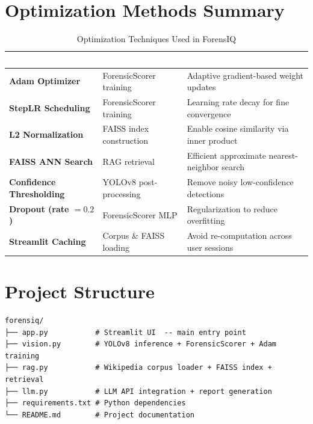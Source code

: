 \documentclass[12pt,a4paper]{article}
\begin{document}
\section{Optimization Methods Summary}

\begin{table}[h!]
  \centering
  \caption{Optimization Techniques Used in ForensIQ}
  \begin{tabular}{>{\bfseries}p{4.5cm} p{4cm} p{5cm}}
    \toprule
    \rowcolor{tableheader}
    \textcolor{white}{Method} & \textcolor{white}{Location} & \textcolor{white}{Purpose} \\
    \midrule
    Adam Optimizer          & ForensicScorer training  & Adaptive gradient-based weight updates \\
    \addlinespace
    StepLR Scheduling       & ForensicScorer training  & Learning rate decay for fine convergence \\
    \addlinespace
    L2 Normalization        & FAISS index construction & Enable cosine similarity via inner product \\
    \addlinespace
    FAISS ANN Search        & RAG retrieval            & Efficient approximate nearest-neighbor search \\
    \addlinespace
    Confidence Thresholding & YOLOv8 post-processing   & Remove noisy low-confidence detections \\
    \addlinespace
    Dropout (rate $= 0.2$)  & ForensicScorer MLP       & Regularization to reduce overfitting \\
    \addlinespace
    Streamlit Caching       & Corpus \& FAISS loading  & Avoid re-computation across user sessions \\
    \bottomrule
  \end{tabular}
\end{table}

\section{Project Structure}

\begin{lstlisting}[style=bashstyle, caption={Repository Layout}]
forensiq/
├── app.py           # Streamlit UI  -- main entry point
├── vision.py        # YOLOv8 inference + ForensicScorer + Adam training
├── rag.py           # Wikipedia corpus loader + FAISS index + retrieval
├── llm.py           # LLM API integration + report generation
├── requirements.txt # Python dependencies
└── README.md        # Project documentation
\end{lstlisting}
\end{document}
